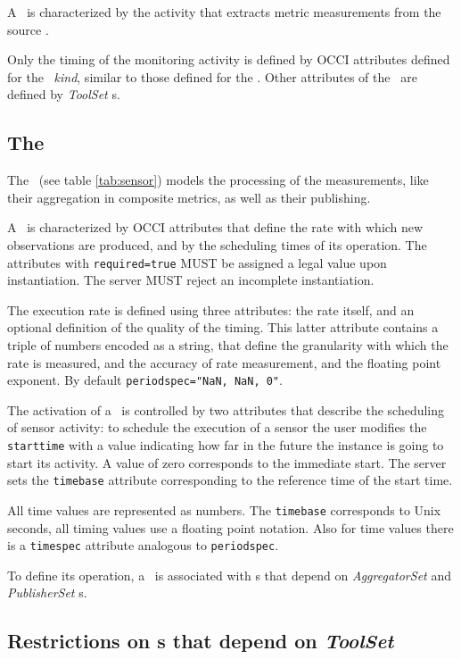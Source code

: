 \documentclass[12pt]{article}  %
\begin{document}
A \coll\ is characterized by the activity that extracts metric measurements from the source \rs.

Only the timing of the monitoring activity is defined by OCCI attributes defined for the \coll\ {\em kind}, similar to those defined for the \sens . Other attributes of the \coll\ are defined by {\em ToolSet} \mi s. 

\subsection{The \sens \label{sec:sensor}}



The \sens\ (see table \ref{tab:sensor}) models the processing of the measurements, like their aggregation in composite metrics, as well as their publishing.

A \sens\ is characterized by OCCI attributes that define the rate with which new observations are produced, and by the scheduling times of its operation. The attributes with \verb|required=true| MUST be assigned a legal value upon instantiation. The server MUST reject an incomplete instantiation.

The execution rate is defined using three attributes: the rate itself, and an optional definition of the quality of the timing. This latter attribute contains a triple of numbers encoded as a string, that define the granularity with which the rate is measured, and the accuracy of rate measurement, and the floating point exponent. By default \verb|periodspec="NaN, NaN, 0"|.

The activation of a \sens\ is controlled by two attributes that describe the scheduling of sensor activity: to schedule the execution of a sensor the user modifies the {\tt starttime} with a value indicating how far in the future the instance is going to start its activity. A value of zero corresponds to the immediate start. The server sets the {\tt timebase} attribute corresponding to the reference time of the start time.

All time values are represented as numbers. The {\tt timebase} corresponds to Unix seconds, all timing values use a floating point notation. Also for time values there is a {\tt timespec} attribute analogous to {\tt periodspec}.

To define its operation, a \sens\ is associated with \mi s that depend on {\em AggregatorSet} and {\em PublisherSet} \mi s.


\subsection{Restrictions on \mi s that depend on {\em ToolSet} \label{sec:Tool}}
\end{document}
